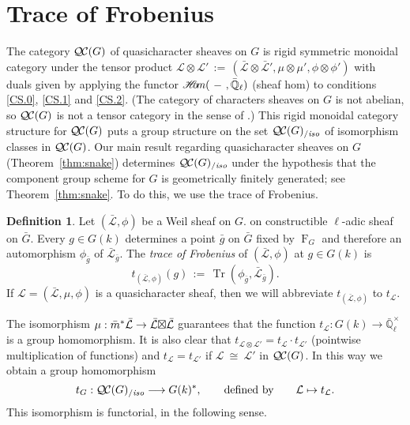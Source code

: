 \documentclass[11pt]{amsart}
\theoremstyle{plain}
\newtheorem{proposition}[theorem]{Proposition}
\theoremstyle{definition}
\newtheorem{definition}[theorem]{Definition}
\theoremstyle{remark}
\newcommand{\EE}{\mathbb{\bar Q}_\ell}
\newcommand{\Fq}{k}
\newcommand{\EEx}{\EE^\times}
\newcommand{\Frob}[1]{\operatorname{F}_{#1}}
\DeclareMathOperator{\trace}{Tr}
\newcommand{\cdef}[1]{ {#1}\index{#1} }
\newcommand{\sheafHom}{{\mathscr{H}\hskip-4pt{\it o}\hskip-2pt{\it m}}}
\newcommand{\ceq}{{\, :=\, }}
\newcommand{\iso}{{\ \cong\ }}
\newcommand{\cs}[1]{{\mathcal{#1}}}
\newcommand{\gcs}[1]{{\mathcal{\bar #1}}}
\newcommand{\QC}{{\mathcal{Q\hskip-0.8pt C}}}
\newcommand{\QCiso}[1]{\QC(#1)_{/\textit{iso}}}
\newcommand{\trFrob}[1]{t_{#1}}
\newcommand{\bg}{\bar{g}}
\newcommand{\bm}{\bar{m}}
\newcommand{\bG}{\bar{G}}
\newcommand{\tight}[3]{\hspace{-#1pt}{#2}\hspace{-#3pt}}
\newcommand{\LxL}{\text{$\gcs{L} \tight{0}{\boxtimes}{0} \gcs{L}$}}
\begin{document}
\section{Trace of Frobenius}\label{sec:Frob}

The category $\QC(G)$ of quasicharacter sheaves on $G$ is rigid symmetric monoidal category \cite{etingof:tensorcat} under the tensor product
$\cs{L} \otimes \cs{L'} \ceq (\gcs{L}\otimes\gcs{L'}, \mu\otimes\mu', \phi\otimes \phi')$
with duals given by applying the functor 
$\sheafHom(\ - \ ,\EE)$ (sheaf hom) to
conditions \ref{CS.0}, \ref{CS.1} and \ref{CS.2}.
(The category of characters sheaves on $G$ is not abelian, so $\QC(G)$
is not a tensor category in the sense of \cite{deligne:02a}.)
%
This rigid monoidal category structure for $\QC(G)$ puts a group
structure on the set $\QCiso{G}$ of isomorphism classes in
$\QC(G)$. Our main result regarding quasicharacter sheaves on $G$ (Theorem~\ref{thm:snake})
determines $\QCiso{G}$ under the hypothesis that the component group scheme for $G$ is geometrically finitely generated; see Theorem~\ref{thm:snake}. To do this, we use the trace of Frobenius.

\begin{definition}\label{def:trFrob}
Let $(\gcs{L},\phi)$ be a Weil sheaf on $G$. on constructible $\ell$-adic sheaf on $\bG$. Every $g\in G(\Fq)$
determines a point $\bg$ on $\bG$ fixed by $\Frob{G}$ and
therefore an automorphism $\phi_{\bg}$ of $\gcs{L}_{\bg}$. The \emph{trace of Frobenius} of $(\gcs{L},\phi)$ at $g\in G(\Fq)$ is 
\[
\trFrob{(\gcs{L},\phi)}(g) \ceq \trace(\phi_{\bg}, \gcs{L}_{\bg}).
\]
If $\cs{L} = (\gcs{L},\mu,\phi)$ is a quasicharacter sheaf, 
then we will abbreviate $\trFrob{(\gcs{L},\phi)}$ to $\trFrob{\cs{L}}$.
\end{definition}

The isomorphism $\mu : \bm^* \gcs{L} \to \LxL$ guarantees 
that the function $\trFrob{\cs{L}} : G(\Fq)\to \EEx$ is a group homomorphism.
It is also clear that $\trFrob{\cs{L}\otimes \cs{L'}} = \trFrob{\cs{L}} \cdot \trFrob{\cs{L'}}$
(pointwise multiplication of functions) and $\trFrob{\cs{L}} = \trFrob{\cs{L'}}$
if $\cs{L} \iso \cs{L'}$ in $\QC(G)$. In this way we obtain a group homomorphism
\[
\cdef{\trFrob{G}} : \QCiso{G} \longrightarrow G(\Fq)^*,
\qquad \text{defined by}\qquad \cs{L} \mapsto \trFrob{\cs{L}}.
\]
This isomorphism is functorial, in the following sense.
\end{document}
